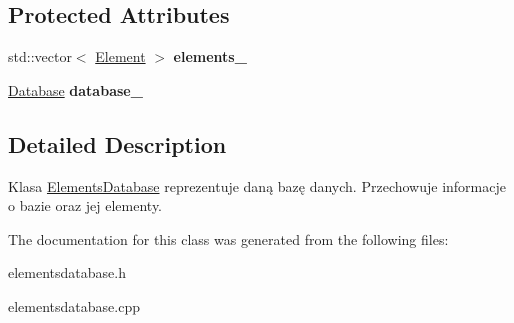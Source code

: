 \subsection*{Protected Attributes}
\begin{DoxyCompactItemize}
\item 
\mbox{\label{class_elements_database_ab90a3763844239b40a3e6bceafe5651b}} 
std\+::vector$<$ \mbox{\hyperlink{class_element}{Element}} $>$ {\bfseries elements\+\_\+}
\item 
\mbox{\label{class_elements_database_ad0177aeef6289d365c12a8bbcdfeea37}} 
\mbox{\hyperlink{class_database}{Database}} {\bfseries database\+\_\+}
\end{DoxyCompactItemize}


\subsection{Detailed Description}
Klasa \mbox{\hyperlink{class_elements_database}{Elements\+Database}} reprezentuje daną bazę danych. Przechowuje informacje o bazie oraz jej elementy. 

The documentation for this class was generated from the following files\+:\begin{DoxyCompactItemize}
\item 
elementsdatabase.\+h\item 
elementsdatabase.\+cpp\end{DoxyCompactItemize}
